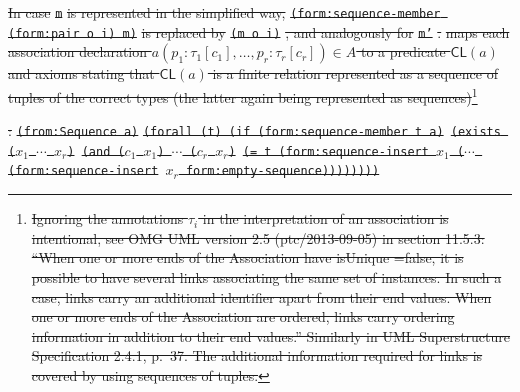 \documentclass[10pt,fleqn,final]{scrreprt}
\newcommand*{\CL}{\ensuremath{\mathsf{CL}}\xspace}
\newenvironment{definitions}[0]{\medskip }{}
\newcommand{\white}[1]{{\color{white}{#1}}}
\newcommand{\qqquad}{\white{x}\qquad}
\providecommand{\DIFdel}[1]{{\protect\color{red}\sout{#1}}}                      %
\providecommand{\DIFdelbegin}{} %
\providecommand{\DIFdelend}{} %
\begin{document}
\begin{definitions}
\begin{itemize}[topsep=0pt, label=--, leftmargin=*]
{\DIFdelbegin \DIFdel{In case }\texttt{\DIFdel{m}} %
\DIFdel{is represented in the simplified way, }\texttt{\DIFdel{(form:sequence-member (form:pair o i) m)}} %
\DIFdel{is replaced by }\texttt{\DIFdel{(m o i)}}%
\DIFdel{, and analogously for }\texttt{\DIFdel{m'}}%
\DIFdel{.
  }%
\DIFdel{maps each association declaration $a(p_1 : \tau_1[c_1], \ldots, p_r : \tau_r[c_r])\in A$ to a predicate $\CL(a)$ and axioms stating that $\CL(a)$ is a finite relation represented as a sequence of tuples of the correct types (the latter again
being represented as sequences)}\footnote{\DIFdel{Ignoring the annotations $\tau_i$ in the interpretation of an association is intentional, see OMG UML version 2.5 (ptc/2013-09-05) in section 11.5.3: ``When one or more ends of the Association have isUnique =false, it is possible to have several links associating the same set of
instances. In such a case, links carry an additional identifier apart from their end values.
When one or more ends of the Association are ordered, links carry ordering information in addition to their end values.'' Similarly in UML Superstructure Specification 2.4.1, p.~37.  The additional information required for links is covered by using sequences of tuples.}}%
\addtocounter{footnote}{-1}%
\DIFdel{:}%
\texttt{\DIFdel{(from:Sequence a)}}%
\texttt{\DIFdel{(forall (t) (if (form:sequence-member t a)}%
\DIFdel{(exists ($x_1$ $\cdots$ $x_r$)}%
\DIFdel{(and ($c_1$ $x_1$) $\cdots$ ($c_r$ $x_r$)}%
\DIFdel{(= t (form:sequence-insert $x_1$ ($\cdots$ (form:sequence-insert}%
\DIFdel{$x_r$ form:empty-sequence))))))))}}
\DIFdelend 

}
\end{itemize}
\end{definitions}
\end{document}
